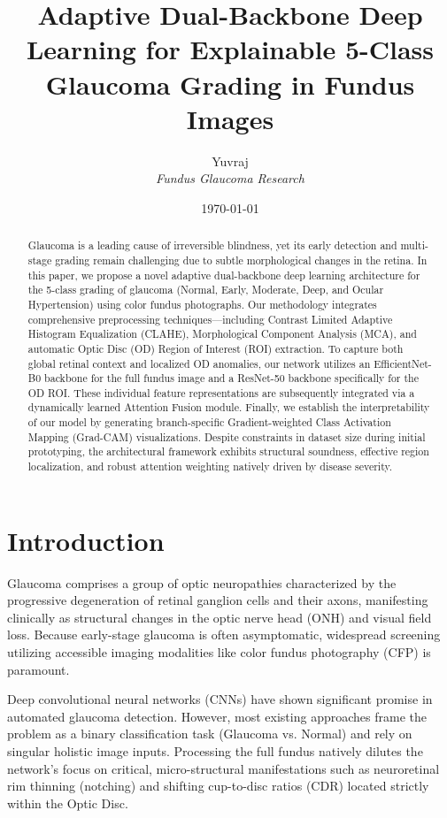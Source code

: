 \documentclass[a4paper,11pt]{article}
\title{Adaptive Dual-Backbone Deep Learning for Explainable 5-Class Glaucoma Grading in Fundus Images}
\author{Yuvraj \\ \textit{Fundus Glaucoma Research}}
\date{\today}
\begin{document}
\maketitle

\begin{abstract}
Glaucoma is a leading cause of irreversible blindness, yet its early detection and multi-stage grading remain challenging due to subtle morphological changes in the retina. In this paper, we propose a novel adaptive dual-backbone deep learning architecture for the 5-class grading of glaucoma (Normal, Early, Moderate, Deep, and Ocular Hypertension) using color fundus photographs. Our methodology integrates comprehensive preprocessing techniques---including Contrast Limited Adaptive Histogram Equalization (CLAHE), Morphological Component Analysis (MCA), and automatic Optic Disc (OD) Region of Interest (ROI) extraction. To capture both global retinal context and localized OD anomalies, our network utilizes an EfficientNet-B0 backbone for the full fundus image and a ResNet-50 backbone specifically for the OD ROI. These individual feature representations are subsequently integrated via a dynamically learned Attention Fusion module. Finally, we establish the interpretability of our model by generating branch-specific Gradient-weighted Class Activation Mapping (Grad-CAM) visualizations. Despite constraints in dataset size during initial prototyping, the architectural framework exhibits structural soundness, effective region localization, and robust attention weighting natively driven by disease severity.
\end{abstract}

\section{Introduction}
Glaucoma comprises a group of optic neuropathies characterized by the progressive degeneration of retinal ganglion cells and their axons, manifesting clinically as structural changes in the optic nerve head (ONH) and visual field loss. Because early-stage glaucoma is often asymptomatic, widespread screening utilizing accessible imaging modalities like color fundus photography (CFP) is paramount.

Deep convolutional neural networks (CNNs) have shown significant promise in automated glaucoma detection. However, most existing approaches frame the problem as a binary classification task (Glaucoma vs. Normal) and rely on singular holistic image inputs. Processing the full fundus natively dilutes the network's focus on critical, micro-structural manifestations such as neuroretinal rim thinning (notching) and shifting cup-to-disc ratios (CDR) located strictly within the Optic Disc.
\end{document}
